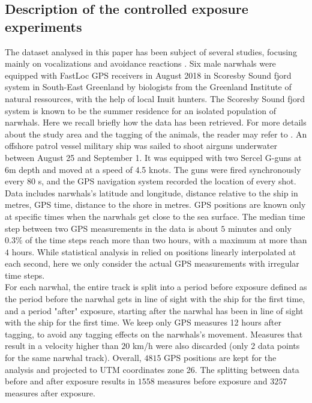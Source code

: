 \documentclass[11pt]{article}
\newcommand {\1}{\mathbb{1}}
\theoremstyle{definition}
\theoremstyle{remark}
\theoremstyle{remark}
\begin{document}
\subsection{Description of the controlled exposure experiments}

The dataset analysed in this paper has been subject of several studies, focusing mainly on vocalizations and avoidance reactions \cite{heide-jorgensen_behavioral_2021,tervo_narwhals_2021}. 
Six male narwhals were equipped with FastLoc GPS receivers in August 2018 in Scoresby Sound fjord system in South-East Greenland by biologists from the Greenland Institute of natural ressources, with the help of local Inuit hunters. The Scoresby Sound fjord system
is known to be the summer residence for an isolated population of narwhals.
Here we recall briefly how the data has been retrieved. For more details about the study area and the tagging of the animals, the reader may refer to \cite{heide-jorgensen_behavioral_2021}. 
An offshore patrol vessel military ship was sailed to shoot airguns underwater between August 25 and September 1. It was equipped with two Sercel G-guns at 6m depth and moved at a speed of 4.5 knots. The guns were fired synchronously every 80 s, and the GPS navigation system recorded the location of every shot. 
Data includes narwhals's latitude and longitude, distance relative to the ship in metres, GPS time, distance to the shore in metres. GPS positions are known only at specific times when the narwhals get close to the sea surface. The median time step between two GPS measurements in the data is about $5$ minutes and only $0.3 \%$ of the time steps reach more than two hours, with a maximum at more than $4$ hours. While statistical analysis in \cite{heide-jorgensen_behavioral_2021} relied on positions linearly interpolated at each second, here we only consider the actual GPS measurements with irregular time steps.\\




For each narwhal, the entire track is split into a period before exposure defined as the period before the narwhal gets in line of sight with the ship for the first time, and a period "after" exposure, starting after the narwhal has been in line of sight with the ship for the first time. We keep only GPS measures 12 
hours after tagging, to avoid any tagging effects on the narwhals's movement. Measures that result in a velocity higher than $20$ km/h were also discarded (only 2 data points for the same narwhal track).
Overall, $4815$ GPS positions are kept for the analysis and projected to UTM coordinates zone 26. The splitting between data before and after exposure results in $1558$ measures before exposure and $3257$ measures after exposure.
\end{document}
